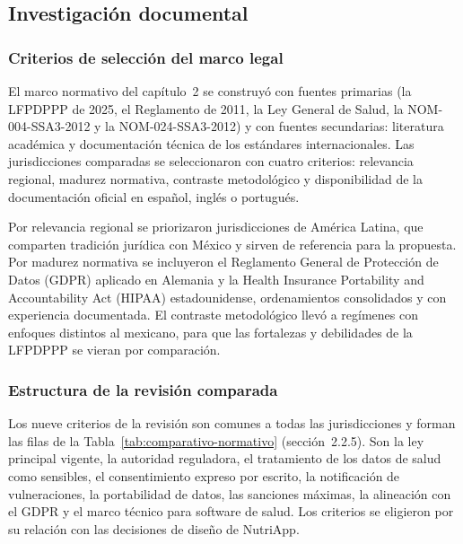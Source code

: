 \documentclass[12pt, a4paper]{article}
\begin{document}
\subsection{Investigación documental}
 
\subsubsection{Criterios de selección del marco legal}
 
El marco normativo del capítulo~2 se construyó con fuentes primarias
(la LFPDPPP de 2025, el Reglamento de 2011, la Ley General de Salud,
la NOM-004-SSA3-2012 y la NOM-024-SSA3-2012) y con fuentes secundarias:
literatura académica y documentación técnica de los estándares
internacionales. Las jurisdicciones comparadas se seleccionaron con
cuatro criterios: relevancia regional, madurez normativa, contraste
metodológico y disponibilidad de la documentación oficial en español,
inglés o portugués.
 
Por relevancia regional se priorizaron jurisdicciones de América
Latina, que comparten tradición jurídica con México y sirven de
referencia para la propuesta. Por madurez normativa se incluyeron el
Reglamento General de Protección de Datos (GDPR) aplicado en Alemania y la Health Insurance Portability and Accountability Act (HIPAA) estadounidense, ordenamientos
consolidados y con experiencia documentada. El contraste metodológico
llevó a regímenes con enfoques distintos al mexicano, para que las
fortalezas y debilidades de la LFPDPPP se vieran por comparación.
 
\subsubsection{Estructura de la revisión comparada}
 
Los nueve criterios de la revisión son comunes a todas las
jurisdicciones y forman las filas de la Tabla~\ref{tab:comparativo-normativo}
(sección~2.2.5). Son la ley principal vigente, la autoridad reguladora,
el tratamiento de los datos de salud como sensibles, el consentimiento
expreso por escrito, la notificación de vulneraciones, la portabilidad de
datos, las sanciones máximas, la alineación con el GDPR y el marco
técnico para software de salud. Los criterios se eligieron por su relación con las decisiones de
diseño de NutriApp.
 
\end{document}

